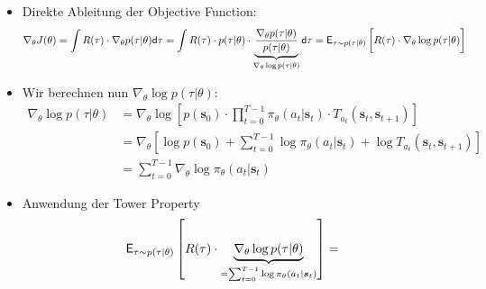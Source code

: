 \documentclass[a4paper, 12pt]{scrartcl}
\begin{document}
\begin{beweis}
    \begin{itemize}
        \item Direkte Ableitung der Objective Function:
        \begin{align*}
            \nabla_{\theta} J(\theta)
            &=
            \int R(\tau) \cdot \nabla_{\theta} p(\tau|\theta) \mathsf{d}\tau 
            =
            \int R(\tau) \cdot p(\tau|\theta) \cdot 
            \underbrace{
                \frac{\nabla_{\theta} p(\tau|\theta)}{p(\tau|\theta)}
            }_{
                \nabla_{\theta} \log p(\tau|\theta)
            }
            \mathsf{d}\tau 
            =
            \mathsf{E}_{\tau \sim p(\tau|\theta)} 
            \left[ 
                \vphantom{\int}
                R(\tau) \cdot \nabla_{\theta} \log p(\tau|\theta) 
            \right]        
        \end{align*}
        \item  Wir berechnen nun $\nabla_{\theta} \log p(\tau|\theta)$:
        \begin{align*}
            \nabla_{\theta} \log p(\tau|\theta)
            &=
            \nabla_{\theta} \log 
            \left[
                p(\bm{s}_0) \cdot 
                \prod_{t=0}^{T-1} \pi_{\theta}(a_t|\bm{s}_t) 
                \cdot T_{a_t}(\bm{s}_t, \bm{s}_{t+1})
            \right] \\
            &=
            \nabla_{\theta} 
            \left[
                \log p(\bm{s}_0) + 
                \sum_{t=0}^{T-1} 
                \log \pi_{\theta}(a_t|\bm{s}_t) +
                \log T_{a_t}(\bm{s}_t, \bm{s}_{t+1})
            \right] \\
            &=
            \sum_{t=0}^{T-1} 
            \nabla_{\theta} \log \pi_{\theta}(a_t|\bm{s}_t)
        \end{align*}
        \item  Anwendung der Tower Property 
        \begin{align*}
            \mathsf{E}_{\tau \sim p(\tau|\theta)} 
            \left[ 
                \vphantom{\int}
                R(\tau) \cdot  
                \underbrace{
                    \nabla_{\theta} \log p(\tau|\theta)
                }_{
                    = \sum_{t=0}^{T-1} \log \pi_{\theta}(a_t|\bm{s}_t)
                }
            \right]   
            &=

\end{align*}
\end{itemize}
\end{beweis}
\end{document}
